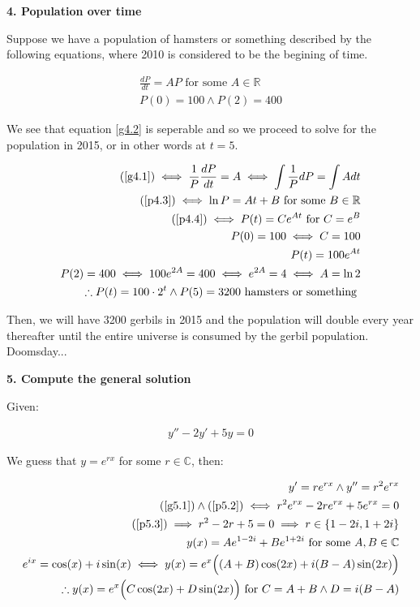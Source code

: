 \documentclass{article}
\newcommand{\reals}{\mathbb{R}}
\newcommand{\cplx}{\mathbb{C}}
\begin{document}
\medskip

\textbf{4. Population over time}

Suppose we have a population of hamsters or something described by the following equations,
where 2010 is considered to be the begining of time.

\begin{align}
	\label{g4.1}
	\frac{dP}{dt} = AP \textrm{ for some } A \in \reals \\
	\label{g4.2}
	P(0) = 100 \land P(2) = 400
\end{align}

We see that equation \ref{g4.2} is seperable
and so we proceed to solve for the population in 2015,
or in other words at $t = 5$.

\begin{align}
	\label{p4.3}
	(\ref{g4.1}) \iff \frac{1}{P} \frac{dP}{dt} = A \iff \int \frac{1}{P} dP = \int A dt \\
	\label{p4.4}
	(\ref{p4.3}) \iff \ln P = At + B \textrm{ for some } B \in \reals \\
	(\ref{p4.4}) \iff P(t) = Ce^{At} \textrm{ for } C = e^B \\
	P(0) = 100 \iff C = 100 \\
	P(t) = 100e^{At} \\
	P(2) = 400 \iff 100e^{2A} = 400 \iff e^{2A} = 4 \iff A = \ln 2 \\
	\therefore P(t) = 100 \cdot 2^t \land P(5) = 3200 \textrm{ hamsters or something }
\end{align}

Then, we will have 3200 gerbils in 2015 and the population will double every year thereafter
until the entire universe is consumed by the gerbil population. Doomsday...

\medskip

\textbf{5. Compute the general solution}

Given:

\begin{align}
	\label{g5.1}
	y'' - 2y' + 5y = 0
\end{align}

We guess that $y = e^{rx}$ for some $r \in \cplx$, then:

\begin{align}
	\label{p5.2}
	y' = re^{rx} \land y'' = r^2e^{rx} \\
	\label{p5.3}
	(\ref{g5.1}) \land (\ref{p5.2}) \iff r^2e^{rx} - 2re^{rx} + 5e^{rx} = 0 \\
	\label{p5.4}
	(\ref{p5.3}) \implies r^2 - 2r + 5 = 0 \implies r \in \{ 1-2i, 1+2i \} \\
	y(x) = Ae^{1-2i} + Be^{1+2i} \textrm{ for some } A,B \in \cplx \\
	e^{ix} = \cos(x) + i \sin(x) \iff y(x) = e^x\Big((A+B)\cos(2x) + i(B-A)\sin(2x)\Big) \\
	\therefore y(x) = e^x\Big(C\cos(2x) + D\sin(2x)\Big) \textrm{ for } C = A + B \land D = i(B-A)
\end{align}
\end{document}
